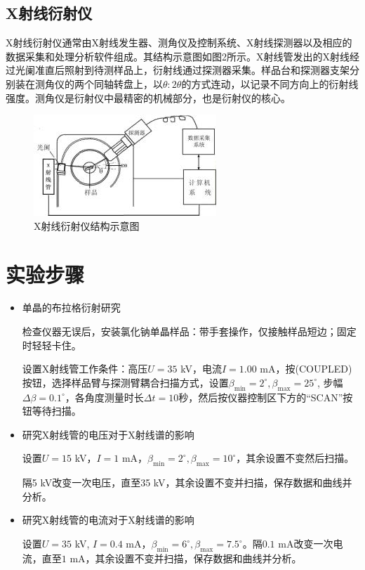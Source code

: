 \documentclass[11pt,a4paper]{article}
\begin{document}
\subsection{X射线衍射仪}
X射线衍射仪通常由X射线发生器、测角仪及控制系统、X射线探测器以及相应的数据采集和处理分析软件组成。其结构示意图如图2所示。X射线管发出的X射线经过光阑准直后照射到待测样品上，衍射线通过探测器采集。样品台和探测器支架分别装在测角仪的两个同轴转盘上，以$\theta:2\theta$的方式连动，以记录不同方向上的衍射线强度。测角仪是衍射仪中最精密的机械部分，也是衍射仪的核心。

\begin{figure}[H]
\centering
\includegraphics[scale=0.7]{2.jpg}
\captionsetup{font=footnotesize}
\caption{X射线衍射仪结构示意图}
\end{figure}

\section{实验步骤}

\begin{itemize}
    \item 单晶的布拉格衍射研究
    
    检查仪器无误后，安装氯化钠单晶样品：带手套操作，仅接触样品短边；固定时轻轻卡住。
    
    设置X射线管工作条件：高压$U=35$ kV，电流$I=1.00$ mA，按(COUPLED)按钮，选择样品臂与探测臂耦合扫描方式，设置$\beta_{\min}=2^\circ,\beta_{\max}=25^\circ$, 步幅$\Delta\beta=0.1^\circ$，各角度测量时长$\Delta t=10$秒，然后按仪器控制区下方的“SCAN”按钮等待扫描。
    
    \item 研究X射线管的电压对于X射线谱的影响
    
    设置$U=15$ kV，$I=1$ mA，$\beta_{\min}=2^\circ,\beta_{\max}=10^\circ$，其余设置不变然后扫描。
    
    隔5 kV改变一次电压，直至35 kV，其余设置不变并扫描，保存数据和曲线并分析。
    

    \item 研究X射线管的电流对于X射线谱的影响
    
    设置$U=35$ kV, $I=0.4$ mA，$\beta_{\min}=6^\circ,\beta_{\max}=7.5^\circ$。隔$0.1$ mA改变一次电流，直至$1$ mA，其余设置不变并扫描，保存数据和曲线并分析。
    \end{itemize}
\end{document}
